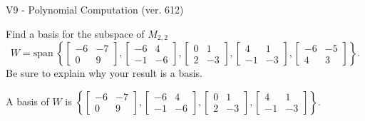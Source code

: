 \begin{exercise}
  \begin{exerciseTitle}V9 - Polynomial Computation (ver. 612)\end{exerciseTitle}
  \begin{exerciseStatement}
    Find a basis for the subspace of \(M_{2,2}\) 
\[W=\mathrm{span}\ \left\{\left[\begin{array}{cc}
-6 & -7 \\
0 & 9
\end{array}\right] , \left[\begin{array}{cc}
-6 & 4 \\
-1 & -6
\end{array}\right] , \left[\begin{array}{cc}
0 & 1 \\
2 & -3
\end{array}\right] , \left[\begin{array}{cc}
4 & 1 \\
-1 & -3
\end{array}\right] , \left[\begin{array}{cc}
-6 & -5 \\
4 & 3
\end{array}\right]\right\}.\]
 Be sure to explain why your result is a basis.


  \end{exerciseStatement}
  \begin{exerciseAnswer}
   A basis of \(W\) is  \(\left\{\left[\begin{array}{cc}
-6 & -7 \\
0 & 9
\end{array}\right] , \left[\begin{array}{cc}
-6 & 4 \\
-1 & -6
\end{array}\right] , \left[\begin{array}{cc}
0 & 1 \\
2 & -3
\end{array}\right] , \left[\begin{array}{cc}
4 & 1 \\
-1 & -3
\end{array}\right]\right\}\).
  


  \end{exerciseAnswer}
\end{exercise}